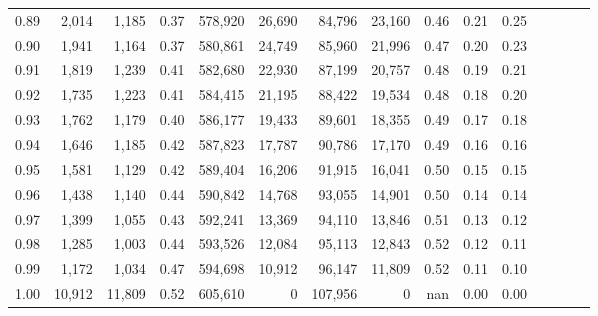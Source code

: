 \begin{tabular}{rrrcrrrrrrrrrrr}
0.89 &   2,014 &   1,185 &                                       0.37 &  578,920 &   26,690 &   84,796 &   23,160 &  0.46 &  0.21 &                         0.25 \\
0.90 &   1,941 &   1,164 &                                       0.37 &  580,861 &   24,749 &   85,960 &   21,996 &  0.47 &  0.20 &                         0.23 \\
0.91 &   1,819 &   1,239 &                                       0.41 &  582,680 &   22,930 &   87,199 &   20,757 &  0.48 &  0.19 &                         0.21 \\
0.92 &   1,735 &   1,223 &                                       0.41 &  584,415 &   21,195 &   88,422 &   19,534 &  0.48 &  0.18 &                         0.20 \\
0.93 &   1,762 &   1,179 &                                       0.40 &  586,177 &   19,433 &   89,601 &   18,355 &  0.49 &  0.17 &                         0.18 \\
0.94 &   1,646 &   1,185 &                                       0.42 &  587,823 &   17,787 &   90,786 &   17,170 &  0.49 &  0.16 &                         0.16 \\
0.95 &   1,581 &   1,129 &                                       0.42 &  589,404 &   16,206 &   91,915 &   16,041 &  0.50 &  0.15 &                         0.15 \\
0.96 &   1,438 &   1,140 &                                       0.44 &  590,842 &   14,768 &   93,055 &   14,901 &  0.50 &  0.14 &                         0.14 \\
0.97 &   1,399 &   1,055 &                                       0.43 &  592,241 &   13,369 &   94,110 &   13,846 &  0.51 &  0.13 &                         0.12 \\
0.98 &   1,285 &   1,003 &                                       0.44 &  593,526 &   12,084 &   95,113 &   12,843 &  0.52 &  0.12 &                         0.11 \\
0.99 &   1,172 &   1,034 &                                       0.47 &  594,698 &   10,912 &   96,147 &   11,809 &  0.52 &  0.11 &                         0.10 \\
1.00 &  10,912 &  11,809 &                                       0.52 &  605,610 &        0 &  107,956 &        0 &   nan &  0.00 &                         0.00 \\
\bottomrule
\end{tabular}
